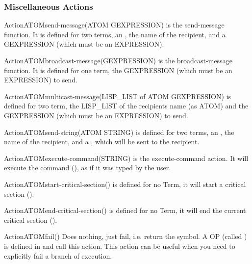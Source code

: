 \subsubsection{Miscellaneous Actions}

\begin{typeefa}{Action}{ATOM}{send-message}{(ATOM GEXPRESSION)}
is the send-message function. It is defined for two terms, an , the
name of the recipient, and a GEXPRESSION (which must be an EXPRESSION).
\end{typeefa}

\begin{typeefa}{Action}{ATOM}{broadcast-message}{(GEXPRESSION)}
is the broadcast-message function. It is defined for one term, the
 GEXPRESSION (which must be an EXPRESSION) to send.
\end{typeefa}

\begin{typeefa}{Action}{ATOM}{multicast-message}{(LISP\_LIST of ATOM GEXPRESSION)}
 is defined for two term,  the LISP\_LIST of the recipients name (as ATOM) and
 the GEXPRESSION (which must be an EXPRESSION) to send. 
\end{typeefa}

\begin{typeefa}{Action}{ATOM}{send-string}{(ATOM STRING)}
  is defined for two terms, an , the name of the recipient, and a
  , which will be sent to the recipient.
\end{typeefa}

\begin{typeefa}{Action}{ATOM}{execute-command}{(STRING)} 
is the execute-command action. It will execute the command (), as if it was typed by the user.
\end{typeefa}

\begin{typeefa}{Action}{ATOM}{start-critical-section}{()}
is defined for no Term, it will start a critical section (). 
\end{typeefa}

\begin{typeefa}{Action}{ATOM}{end-critical-section}{()}
is defined for no Term, it will end the current critical section
(). 
\end{typeefa}

\begin{typeefa}{Action}{ATOM}{fail}{()}
Does nothing, just fail, i.e. return the  symbol. A OP (called
) is defined in  and call this action. This
action can be useful when you need to explicitly fail a branch of execution.
\end{typeefa}

